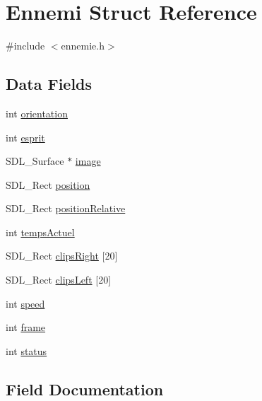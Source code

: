 \hypertarget{structEnnemi}{}\section{Ennemi Struct Reference}
\label{structEnnemi}


{\ttfamily \#include $<$ennemie.\+h$>$}

\subsection*{Data Fields}
\begin{DoxyCompactItemize}
\item 
int \mbox{\hyperlink{structEnnemi_a263073f6a51c5f230e4dc095ada2d076}{orientation}}
\item 
int \mbox{\hyperlink{structEnnemi_afdaf61dbb6cb64c0390ab1df1d304268}{esprit}}
\item 
S\+D\+L\+\_\+\+Surface $\ast$ \mbox{\hyperlink{structEnnemi_aaa6f9be660b13c562cc72213abe89c92}{image}}
\item 
S\+D\+L\+\_\+\+Rect \mbox{\hyperlink{structEnnemi_aa31d169528ee729764721ae9f258fcd7}{position}}
\item 
S\+D\+L\+\_\+\+Rect \mbox{\hyperlink{structEnnemi_a1c9518d04c63608aad25209c8cd1d30f}{position\+Relative}}
\item 
int \mbox{\hyperlink{structEnnemi_a30695691f611dc8bc64be42df6f23b40}{temps\+Actuel}}
\item 
S\+D\+L\+\_\+\+Rect \mbox{\hyperlink{structEnnemi_af4d9831ccfc25b1cc84ef7088affb25a}{clips\+Right}} \mbox{[}20\mbox{]}
\item 
S\+D\+L\+\_\+\+Rect \mbox{\hyperlink{structEnnemi_ae479f564ce8a856160359d440b2ce2d9}{clips\+Left}} \mbox{[}20\mbox{]}
\item 
int \mbox{\hyperlink{structEnnemi_abf051ea1d034df4a8b0480e9387f2008}{speed}}
\item 
int \mbox{\hyperlink{structEnnemi_a13f47ad0b570455b12eb453e18352dd3}{frame}}
\item 
int \mbox{\hyperlink{structEnnemi_a9d03b2261bd09c34c8f44051edd7c164}{status}}
\end{DoxyCompactItemize}


\subsection{Field Documentation}
\mbox{\label{structEnnemi_ae479f564ce8a856160359d440b2ce2d9}} 
